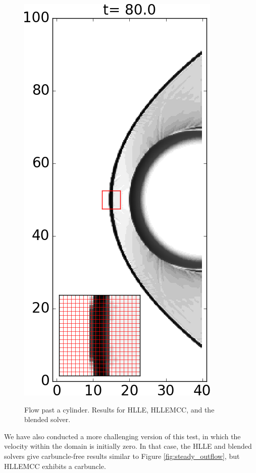 \documentclass[preprint, 11pt]{article}
\begin{document}
\begin{figure}[!h]
{    \includegraphics[scale=0.3]{figures/cylinder_ES.png}
  }
  \caption{
    Flow past a cylinder.  Results for HLLE, HLLEMCC, and the blended solver.
    \label{fig:cylinder_flow}}
\end{figure}

We have also conducted a more challenging version of this test, in which
the velocity within the domain is initially zero.  In that case, the HLLE
and blended solvers give carbuncle-free results similar to Figure \ref{fig:steady_outflow},
but HLLEMCC exhibits a carbuncle.
\end{document}

